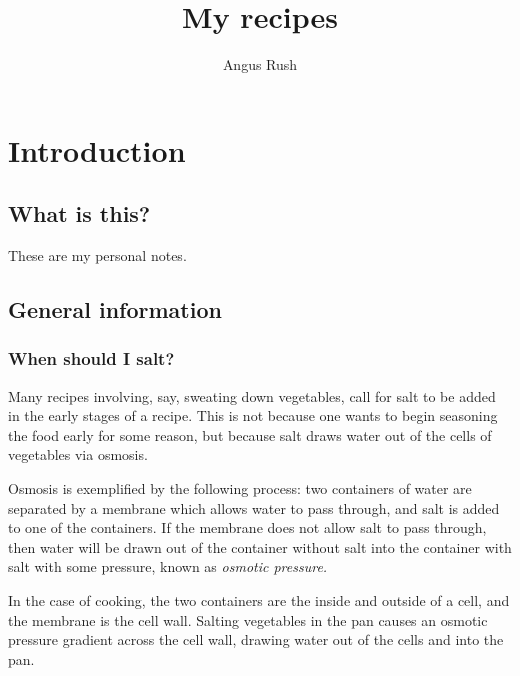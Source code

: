 \documentclass[a4paper,12pt]{scrreprt}
\title{My recipes}
\author{Angus Rush}
\theoremstyle{definition}
\theoremstyle{plain}
\theoremstyle{remark}
\begin{document}
\maketitle
\tableofcontents
\chapter{Introduction}

\section{What is this?}
\label{sec:what_is_this}

These are my personal notes.

\section{General information}\label{sec:general_information}


\subsection{When should I salt?}
\label{ssc:when_salt}

Many recipes involving, say, sweating down vegetables, call for salt to be added in the early stages of a recipe. This is not because one wants to begin seasoning the food early for some reason, but because salt draws water out of the cells of vegetables via osmosis.

Osmosis is exemplified by the following process: two containers of water are separated by a membrane which allows water to pass through, and salt is added to one of the containers. If the membrane does not allow salt to pass through, then water will be drawn out of the container without salt into the container with salt with some pressure, known as \emph{osmotic pressure.}

In the case of cooking, the two containers are the inside and outside of a cell, and the membrane is the cell wall. Salting vegetables in the pan causes an osmotic pressure gradient across the cell wall, drawing water out of the cells and into the pan.
\end{document}
